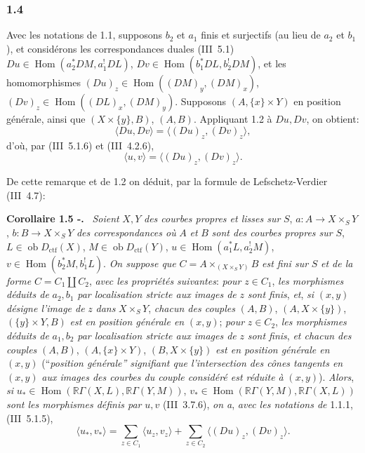 \documentclass[11pt]{article}
\newenvironment{statement}[1]{\par\medskip\noindent\textbf{#1.}\ }{\par\medskip}
\DeclareMathOperator{\Hom}{Hom}
\newcommand{\R}{\mathbb{R}}\newcommand{\RHomCore}{\mathbb{R}\mathrm{Hom}}
\newcommand{\ob}{\operatorname{ob}}
\providecommand{\ctf}{\mathrm{ctf}}
\providecommand{\Hom}{\operatorname{Hom}}
\providecommand{\ob}{\operatorname{ob}}
\providecommand{\R}{\mathrm R}
\providecommand{\Hom}{\operatorname{Hom}}
\begin{document}
\subsubsection*{1.4}
Avec les notations de 1.1, supposons $b_2$ et $a_1$ finis et surjectifs (au lieu de $a_2$ et $b_1$), et considérons les correspondances duales (III~5.1) $Du\in\Hom(a_2^*DM,a_1^!DL)$, $Dv\in\Hom(b_1^*DL,b_2^!DM)$, et les homomorphismes $(Du)_z\in\Hom((DM)_y,(DM)_x)$, $(Dv)_z\in\Hom((DL)_x,(DM)_y)$. Supposons $(A,\{x\}\times Y)$ en position générale, ainsi que $(X\times\{y\},B)$, $(A,B)$. Appliquant 1.2 à $Du,Dv$, on obtient:
\[
\langle Du,Dv\rangle=\langle (Du)_z,(Dv)_z\rangle,
\]
d'où, par (III~5.1.6) et (III~4.2.6),
\begin{equation}\tag{1.4.1}
\langle u,v\rangle=\langle (Du)_z,(Dv)_z\rangle.
\end{equation}

De
cette remarque et de 1.2 on déduit, par la formule de Lefschetz-Verdier (III~4.7):

\begin{statement}{Corollaire 1.5 -}
\emph{Soient} $X,Y$ \emph{des courbes propres et lisses sur} $S$, $a:A\longrightarrow X\times_S Y$, $b:B\longrightarrow X\times_S Y$ \emph{des correspondances où} $A$ \emph{et} $B$ \emph{sont des courbes propres sur} $S$, $L\in\ob D_{\ctf}(X)$, $M\in\ob D_{\ctf}(Y)$, $u\in\Hom(a_1^*L,a_2^!M)$, $v\in\Hom(b_2^*M,b_1^!L)$. \emph{On suppose que} $C=A\times_{(X\times_S Y)}B$ \emph{est fini sur} $S$ \emph{et de la forme} $C=C_1\amalg C_2$, \emph{avec les propriétés suivantes}: \emph{pour} $z\in C_1$, \emph{les morphismes déduits de} $a_2,b_1$ \emph{par localisation stricte aux images de} $z$ \emph{sont finis}, \emph{et}, \emph{si} $(x,y)$ \emph{désigne l'image de} $z$ \emph{dans} $X\times_S Y$, \emph{chacun des couples} $(A,B)$, $(A,X\times\{y\})$, $(\{y\}\times Y,B)$ \emph{est en position générale en} $(x,y)$; \emph{pour} $z\in C_2$, \emph{les morphismes déduits de} $a_1,b_2$ \emph{par localisation stricte aux images de} $z$ \emph{sont finis}, \emph{et chacun des couples} $(A,B)$, $(A,\{x\}\times Y)$, $(B,X\times\{y\})$ \emph{est en position générale en} $(x,y)$ (``\emph{position générale'' signifiant que l'intersection des cônes tangents en} $(x,y)$ \emph{aux images des courbes du couple considéré est réduite à} $(x,y)$). \emph{Alors}, \emph{si} $u_*\in\Hom(\R\Gamma(X,L),\R\Gamma(Y,M))$, $v_*\in\Hom(\R\Gamma(Y,M),\R\Gamma(X,L))$ \emph{sont les morphismes définis par} $u,v$ (III~3.7.6), \emph{on a}, \emph{avec les notations de} 1.1.1, (III~5.1.5),
\begin{equation}\tag{1.5.1}
\langle u_*,v_*\rangle=\sum_{z\in C_1}\langle u_z,v_z\rangle+\sum_{z\in C_2}\langle (Du)_z,(Dv)_z\rangle.
\end{equation}
\end{statement}
\end{document}
